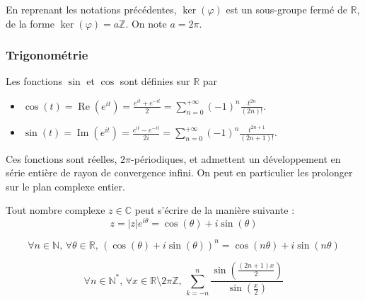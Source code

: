   \begin{proposition}
    En reprenant les notations précédentes, $\ker(\varphi)$ est un sous-groupe fermé de $\mathbb{R}$, de la forme $\ker(\varphi) = a\mathbb{Z}$. On note $a = 2\pi$.
  \end{proposition}

  \subsubsection{Trigonométrie}

  \begin{definition}
    Les fonctions $\sin$ et $\cos$ sont définies sur $\mathbb{R}$ par
    \begin{itemize}
      \item $\cos(t) = \operatorname{Re}(e^{it}) = \frac{e^{it} + e^{-it}}{2} = \sum_{n=0}^{+\infty} (-1)^n \frac{t^{2n}}{(2n)!}$.
      \item $\sin(t) = \operatorname{Im}(e^{it}) = \frac{e^{it} - e^{-it}}{2i} = \sum_{n=0}^{+\infty} (-1)^n \frac{t^{2n+1}}{(2n+1)!}$.
    \end{itemize}
  \end{definition}

  \begin{proposition}
    Ces fonctions sont réelles, $2\pi$-périodiques, et admettent un développement en série entière de rayon de convergence infini. On peut en particulier les prolonger sur le plan complexe entier.
  \end{proposition}


  \begin{proposition}
    Tout nombre complexe $z \in \mathbb{C}$ peut s'écrire de la manière suivante :
    \[ z = \vert z \vert e^{i\theta} = \cos(\theta) + i\sin(\theta) \]
  \end{proposition}

  \begin{proposition}
    \[ \forall n \in \mathbb{N}, \, \forall \theta \in \mathbb{R}, \, (\cos(\theta) + i\sin(\theta))^n = \cos(n\theta) + i\sin(n\theta) \]
  \end{proposition}


  \begin{application}
    \[ \forall n \in \mathbb{N}^*, \, \forall x \in \mathbb{R} \setminus 2\pi\mathbb{Z}, \, \sum_{k=-n}^n \frac{\sin\left( \frac{(2n+1)x}{2} \right)}{\sin\left( \frac{x}{2} \right)} \]
  \end{application}


